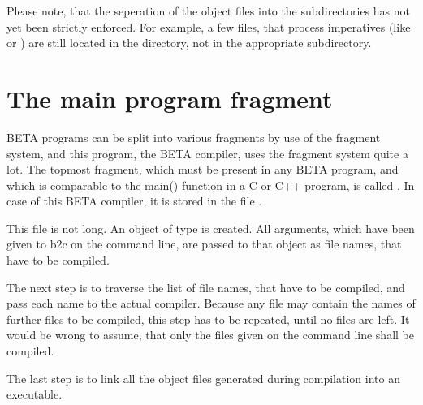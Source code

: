 Please note, that the seperation of the object files into the
subdirectories has not yet been strictly enforced.  For example,
a few files, that process imperatives (like 
or ) are still located in the 
directory, not in the appropriate  subdirectory.

\section{The main program fragment}
BETA programs can be split into various fragments by use of the
fragment system, and this program, the BETA compiler, uses the
fragment system quite a lot.  The topmost fragment, which must
be present in any BETA program, and which is comparable to the
main() function in a C or C++ program, is called
.  In case of this BETA compiler,
it is stored in the file .

This file is not long.  An object of type  is
created.  All arguments, which have been given to b2c on the
command line, are passed to that  object as
file names, that have to be compiled.

The next step is to traverse the list of file names, that have
to be compiled, and pass each name to the actual compiler.
Because any file may contain the names of further files to
be compiled, this step has to be repeated, until no files are
left.  It would be wrong to assume, that only the files given
on the command line shall be compiled.

The last step is to link all the object files generated during
compilation into an executable.

